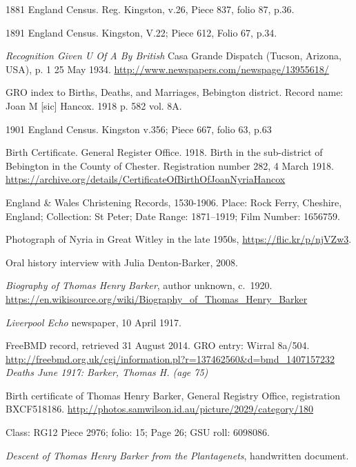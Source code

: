 \begin{thebibliography}{99}
	1881 England Census. Reg. Kingston, v.26, Piece 837, folio 87, p.36.

	1891 England Census. Kingston, V.22; Piece 612, Folio 67, p.34.

	\emph{Recognition Given U Of A By British}
	Casa Grande Dispatch (Tucson, Arizona, USA), p. 1 25 May 1934. \url{http://www.newspapers.com/newspage/13955618/}

	GRO index to Births, Deaths, and Marriages,
	Bebington district. Record name: Joan M [sic] Hancox.
	1918 p. 582 vol. 8A.

	1901 England Census. Kingston v.356; Piece 667, folio 63, p.63

	Birth Certificate. General Register Office.
	1918. Birth in the sub-district of Bebington in the County of Chester.
	Registration number 282, 4 March 1918.
	\url{https://archive.org/details/CertificateOfBirthOfJoanNyriaHancox}

	England \& Wales Christening Records, 1530-1906.
	Place: Rock Ferry, Cheshire, England; Collection: St Peter;
	Date Range: 1871--1919; Film Number: 1656759.

	Photograph of Nyria in Great Witley in the late 1950s,
	\url{https://flic.kr/p/njVZw3}.

	Oral history interview with Julia Denton-Barker, 2008.

	\emph{Biography of Thomas Henry Barker}, author unknown, c.\ 1920.
	\url{https://en.wikisource.org/wiki/Biography_of_Thomas_Henry_Barker}

	\emph{Liverpool Echo} newspaper, 10 April 1917.

	FreeBMD record, retrieved 31 August 2014. GRO entry: Wirral 8a/504.
	\url{http://freebmd.org.uk/cgi/information.pl?r=137462560&d=bmd_1407157232}
	\emph{Deaths June 1917: Barker, Thomas H. (age 75)}

	Birth certificate of Thomas Henry Barker, General Registry Office, registration BXCF518186.
	\url{http://photos.samwilson.id.au/picture/2029/category/180}

	Class: RG12 Piece 2976; folio: 15; Page 26; GSU roll: 6098086.

	\emph{Descent of Thomas Henry Barker from the Plantagenets},
	handwritten document.


\end{thebibliography}
